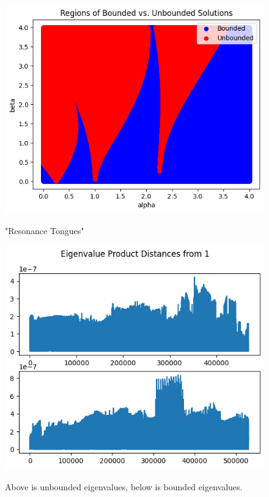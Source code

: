 \documentclass[12pt]{article}
\newcommand{\jump}{\vspace{5mm}}
\begin{document}
\begin{enumerate}[]
\begin{figure}[h]
\centering
\includegraphics[scale = 0.8]{Images/bounded_vs_unbounded_solns.png}
\label{png:bounded_vs_unbounded_solns}
\caption{"Resonance Tongues"}
\end{figure}
\jump
\vspace{\floatsep}

\begin{figure}[h]
\centering
\includegraphics[scale = 0.7]{Images/unbounded_bounded_ev_plots.png}
\label{png:mag_plots}
\caption{Above is unbounded eigenvalues, below is bounded eigenvalues.}
\end{figure}


\end{enumerate}
\end{document}
